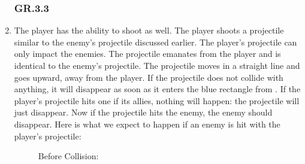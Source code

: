 \documentclass[12pt, letterpaper]{article}
\begin{document}
\begin{enumerate}[label=]
        \subsubsection*{GR.3.3}
        \item The player has the ability to shoot as well. The player shoots a projectile similar to the enemy's projectile discussed earlier. The player's projectile can only impact the enemies. The projectile emanates from the player and is identical to the enemy's projectile. The projectile moves in a straight line and goes upward, away from the player. If the projectile does not collide with anything, it will disappear as soon as it enters the blue rectangle from . If the player's projectile hits one if its allies, nothing will happen: the projectile will just disappear. Now if the projectile hits the enemy, the enemy should disappear. Here is what we expect to happen if an enemy is hit with the player's projectile: 
        \begin{figure}[H]
        Before Collision: 
        \begin{center}
\end{center}
\end{figure}
\end{enumerate}
\end{document}
